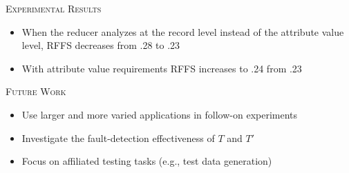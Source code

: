 \documentclass[final,t]{beamer}
\begin{document}
\begin{frame}{}
\begin{columns}[t]
\begin{column}{.325\linewidth}
\begin{block}{\textsc{Experimental Results}}
\begin{itemize}

            \item When the reducer analyzes at the record level
              instead of the attribute value level, RFFS decreases
              from .28 to .23

            \item With attribute value requirements RFFS increases to
              .24 from .23

          \end{itemize}

	\end{block}	    

	\begin{alertblock}{\textsc{Future Work}}
          \begin{itemize}
	  \item Use larger and more varied applications in follow-on experiments
	  \item Investigate the fault-detection effectiveness of $T$ and $T'$
	  \item Focus on affiliated testing tasks (e.g., test data generation)
	  \end{itemize}
	\end{alertblock}
      \end{column}
      
	\end{columns}
  \end{frame}
\end{document}
